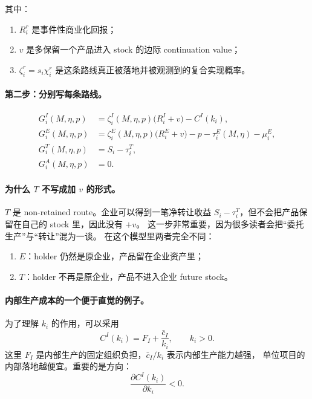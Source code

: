 \documentclass[12pt,UTF8]{ctexart}
\theoremstyle{plain}
\theoremstyle{remark}
\begin{document}
其中：

\begin{enumerate}[leftmargin=2em]
    \item $R_i^r$ 是事件性商业化回报；
    \item $v$ 是多保留一个产品进入 stock 的边际 continuation value；
    \item $\zeta_i^r=s_i\chi_i^r$ 是这条路线真正被落地并被观测到的复合实现概率。
\end{enumerate}

\paragraph{第二步：分别写每条路线。}

\begin{align}
G_i^I(M,\eta,p)
&=
\zeta_i^I(M,\eta,p)\bigl(R_i^I+v\bigr)-C^I(k_i),
\label{eq:GI}\\
G_i^E(M,\eta,p)
&=
\zeta_i^E(M,\eta,p)\bigl(R_i^E+v\bigr)
-p-\tau_i^E(M,\eta)-\mu_i^E,
\label{eq:GE}\\
G_i^T(M,\eta,p)
&=
S_i-\tau_i^T,
\label{eq:GT}\\
G_i^A(M,\eta,p)
&=0.
\label{eq:GA}
\end{align}

\paragraph{为什么 $T$ 不写成加 $v$ 的形式。}
$T$ 是 non-retained route。企业可以得到一笔净转让收益
$S_i-\tau_i^T$，但不会把产品保留在自己的 stock 里，因此没有 $+v$。
这一步非常重要，因为很多读者会把“委托生产”与“转让”混为一谈。
在这个模型里两者完全不同：

\begin{enumerate}[leftmargin=2em]
    \item $E$：holder 仍然是原企业，产品留在企业资产里；
    \item $T$：holder 不再是原企业，产品不进入企业 future stock。
\end{enumerate}

\paragraph{内部生产成本的一个便于直觉的例子。}
为了理解 $k_i$ 的作用，可以采用
\begin{equation}
C^I(k_i)=F_I+\frac{\bar c_I}{k_i},\qquad k_i>0.
\label{eq:CI_example}
\end{equation}
这里 $F_I$ 是内部生产的固定组织负担，$\bar c_I/k_i$ 表示内部生产能力越强，
单位项目的内部落地越便宜。重要的是方向：
\[
\frac{\partial C^I(k_i)}{\partial k_i}<0.
\]
\end{document}
